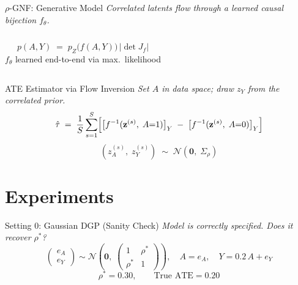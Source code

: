 \documentclass[10pt]{beamer}
\begin{document}
\begin{frame}{$\rho$-GNF: Generative Model}
  \textit{Correlated latents flow through a learned causal bijection $f_\theta$.}
  \begin{columns}[c]
    \[
      p(A,Y) \;=\; p_Z\!\bigl(f(A,Y)\bigr)\,\bigl|\det J_f\bigr|
    \]
    \smallskip
    $f_\theta$ learned end-to-end via max.\ likelihood
  \end{columns}
\end{frame}

\begin{frame}{ATE Estimator via Flow Inversion}
  \textit{Set $A$ in data space; draw $z_Y$ from the correlated prior.}
  \[
    \hat\tau
    \;=\; \frac{1}{S}\sum_{s=1}^{S}
    \Bigl[
      \bigl[f^{-1}(\mathbf{z}^{(s)},\; A{=}1)\bigr]_Y
      \;-\;
      \bigl[f^{-1}(\mathbf{z}^{(s)},\; A{=}0)\bigr]_Y
    \Bigr]
  \]
  \[
    (z_A^{(s)},\; z_Y^{(s)}) \;\sim\; \mathcal{N}(\mathbf{0},\;\Sigma_\rho)
  \]
\end{frame}

\section{Experiments}

\begin{frame}{Setting 0: Gaussian DGP (Sanity Check)}
  \textit{Model is correctly specified. Does it recover $\rho^*$?}
  \[
    \begin{pmatrix}e_A \\ e_Y\end{pmatrix}
    \sim \mathcal{N}\!\left(\mathbf{0},\;
    \begin{pmatrix}1 & \rho^* \\ \rho^* & 1\end{pmatrix}\right)
    ,\quad A = e_A,\quad Y = 0.2\, A + e_Y
  \]
  \[
    \rho^* = 0.30,\qquad \text{True ATE} = 0.20
  \]
\end{frame}
\end{document}
